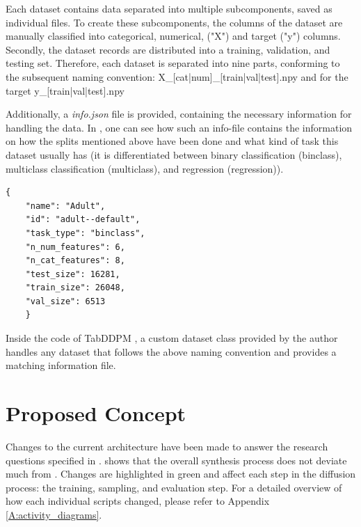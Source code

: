 Each dataset contains data separated into multiple subcomponents, saved as individual files.
To create these subcomponents, the columns of the dataset are manually classified into categorical, numerical, ("X") and target ("y") columns.
Secondly, the dataset records are distributed into a training, validation, and testing set.
Therefore, each dataset is separated into nine parts, conforming to the subsequent naming convention:
X\_[cat|num]\_[train|val|test].npy and for the target y\_[train|val|test].npy

Additionally, a \textit{info.json} file is provided, containing the necessary information for handling the data.
In , one can see how such an info-file contains the information on how the splits mentioned above have been done and what kind of task this dataset usually has (it is differentiated between binary classification (binclass), multiclass classification (multiclass), and regression (regression)).
\begin{lstlisting}[label={lst:info},caption={Example Data-info File}]
    {
    "name": "Adult",
    "id": "adult--default",
    "task_type": "binclass",
    "n_num_features": 6,
    "n_cat_features": 8,
    "test_size": 16281,
    "train_size": 26048,
    "val_size": 6513
    }
\end{lstlisting}
Inside the code of TabDDPM \cite{akim2023TabDDPMModellingTabular}, a custom dataset class provided by the author handles any dataset that follows the above naming convention and provides a matching information file.

\section{Proposed Concept}
\label{ch:conceptualDesign-changes}

Changes to the current architecture have been made to answer the research questions specified in .
 shows that the overall synthesis process does not deviate much from .
Changes are highlighted in green and affect each step in the diffusion process: the training, sampling, and evaluation step.
For a detailed overview of how each individual scripts changed, please refer to Appendix \ref{A:activity_diagrams}.

